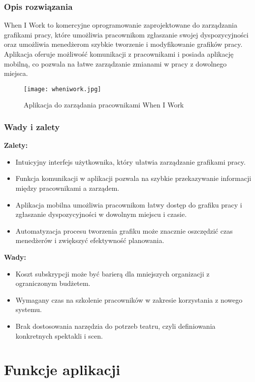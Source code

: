 \documentclass[shortabstract]{iithesis}
\begin{document}
\subsubsection{Opis rozwiązania}
When I Work to komercyjne oprogramowanie zaprojektowane do zarządzania grafikami pracy, które umożliwia pracownikom zgłaszanie swojej dyspozycyjności oraz umożliwia menedżerom szybkie tworzenie i modyfikowanie grafików pracy. Aplikacja oferuje możliwość komunikacji z pracownikami i posiada aplikację mobilną, co pozwala na łatwe zarządzanie zmianami w pracy z dowolnego miejsca.
\begin{figure}[h]
    \centering
    \texttt{[image: wheniwork.jpg]}
    \caption{Aplikacja do zarządania pracownikami When I Work}
    \label{fig:wiw}
\end{figure}

\newpage

\subsubsection{Wady i zalety}

\textbf{Zalety:}
\begin{itemize}
  \item Intuicyjny interfejs użytkownika, który ułatwia zarządzanie grafikami pracy.
  \item Funkcja komunikacji w aplikacji pozwala na szybkie przekazywanie informacji między pracownikami a zarządem.
  \item Aplikacja mobilna umożliwia pracownikom łatwy dostęp do grafiku pracy i zgłaszanie dyspozycyjności w dowolnym miejscu i czasie.
  \item Automatyzacja procesu tworzenia grafiku może znacznie oszczędzić czas menedżerów i zwiększyć efektywność planowania.
\end{itemize}

\textbf{Wady:}
\begin{itemize}
  \item Koszt subskrypcji może być barierą dla mniejszych organizacji z ograniczonym budżetem.
  \item Wymagany czas na szkolenie pracowników w zakresie korzystania z nowego systemu.
  \item Brak dostosowania narzędzia do potrzeb teatru, czyli definiowania konkretnych spektakli i scen.
\end{itemize}

\section{Funkcje aplikacji}
\end{document}
